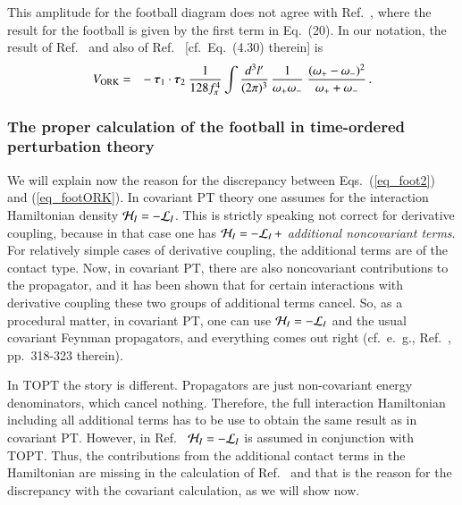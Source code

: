 \documentclass[sort&compress,preprint,3p]{elsarticle}
\newcommand{\bbox}[1]{\mbox{\boldmath $#1$}}
\begin{document}
This amplitude for the football diagram does not agree with Ref.~\cite{ORK96},
where the result for the football is given by the first term
in Eq.~(20). In our notation, the result of Ref.~\cite{ORK96}
and also of Ref.~\cite{EGM98} [cf.\ Eq.~(4.30) therein] is
\begin{eqnarray}
V_{\rm ORK} &=& -
\: \bbox{\tau}_1 \cdot \bbox{\tau}_2 \:
\frac{1}{128 f_\pi^4} 
\int \frac{d^3 l'}{(2\pi)^3} \,
\frac{1}{\omega_+ \omega_-} \; 
\frac{(\omega_+-\omega_-)^2}{\omega_++\omega_-}
\,.
\label{eq_footORK}
\end{eqnarray}


\subsubsection{The proper calculation of the football in time-ordered perturbation theory
\label{app_foot_topt}}

We will explain now the reason for the discrepancy between 
Eqs.~(\ref{eq_foot2}) and (\ref{eq_footORK}).
In covariant PT theory one assumes for the interaction Hamiltonian density
${\cal H}_I = - {\cal L}_I$. 
This is strictly speaking not correct for
derivative coupling, because in that case one has
${\cal H}_I = - {\cal L}_I \, +$ {\it additional noncovariant terms}. 
For relatively simple cases of derivative coupling, the additional terms
are of the contact type. Now, in covariant PT, there are also
noncovariant contributions to the propagator, and it has been shown that 
for certain interactions with derivative coupling these
two groups of additional terms cancel. So, as a procedural matter,
in covariant PT, one can use
${\cal H}_I = - {\cal L}_I$ and the usual covariant Feynman propagators,
and everything comes out right (cf.\ e.~g., Ref.~\cite{Wei95},
pp.~318-323 therein).

In TOPT the story is different. Propagators are just non-covariant
energy denominators, which cancel nothing. Therefore,
the full interaction Hamiltonian 
including all additional terms has to be use to obtain
the same result as in covariant PT. However, in Ref.~\cite{ORK96}
${\cal H}_I = - {\cal L}_I$ is assumed in conjunction with TOPT. 
Thus, the contributions from the additional contact terms in the
Hamiltonian are missing in the calculation of Ref.~\cite{ORK96}
and that is the reason for the discrepancy with the covariant calculation,
as we will show now.
\end{document}
